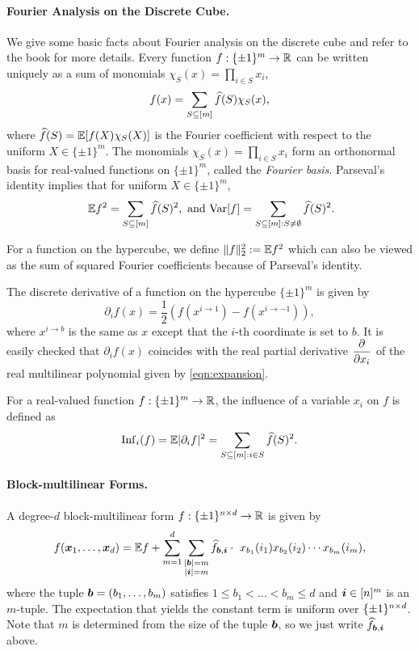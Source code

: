 \paragraph{Fourier Analysis on the Discrete Cube.}
\label{sec:fourier}
We give some basic facts about Fourier analysis on the discrete cube and refer to the book \cite{OD14} for more details. Every function $f: \{\pm1\}^m \to {\mathbb R}$ can be written uniquely as a sum of monomials $\chi_S(x) = \prod_{i \in S} x_i$,
\begin{align}\label{eqn:expansion}
    f(x) = \sum_{S \subseteq [m]} \widehat{f}(S) \chi_S(x),
\end{align}
where $\widehat{f}(S) = \mathbb{E}[f(X)\chi_S(X)]$ is the Fourier coefficient with respect to the uniform $X \in \{\pm 1\}^m$. The monomials $\chi_S(x) = \prod_{i \in S} x_i$ form an orthonormal basis for real-valued functions on $\{\pm1\}^m$, called the \emph{Fourier basis}. Parseval's identity implies that for uniform $X \in \{\pm 1\}^m$,
\begin{align*}
    \ \mathbb{E} f^2 = \sum_{S \subseteq [m]} \widehat{f}(S)^2, \text{ and } \mathrm{Var}[f] = \sum_{S \subseteq [m]: S \neq \emptyset} \widehat{f}(S)^2.
\end{align*}

For a function on the hypercube, we define $\|f\|^2_2 := \mathbb{E} f^2$ which can also be viewed as the sum of squared Fourier coefficients because of Parseval's identity.



The discrete derivative of a function on the hypercube $\{\pm 1\}^m$ is given by  
\[ \partial_i f(x) = \frac{1}{2} (f(x^{i\to 1}) - f(x^{i\to -1})),\]
where $x^{i\to b}$ is the same as $x$ except that the $i$-th coordinate is set to $b$. It is easily checked that $\partial_i f(x)$ coincides with the real partial derivative $\dfrac{\partial{}}{\partial x_i}$ of the real multilinear polynomial given by \eqref{eqn:expansion}. 

For a real-valued function $f: \{\pm 1\}^m \to {\mathbb R}$, the influence of a variable $x_i$ on $f$ is defined as 
\[ \mathrm{Inf}_i(f) = \mathbb{E}| \partial_if|^2 = \sum_{S \subseteq [m] : i \in S} \widehat{f}(S)^2. \]




\paragraph{Block-multilinear Forms.} 



A degree-$d$ block-multilinear form $f: \{\pm 1\}^{n \times d} \to {\mathbb R}$ is given by
\begin{equation}\label{eqn:tensor1}
    f(\boldsymbol{x}_1,\ldots, \boldsymbol{x}_d) =  \mathbb{E} f + \sum_{m = 1}^d \sum_{\substack{|\boldsymbol{b}|=m\\|{\boldsymbol{i}}|=m}} \widehat{f}_{\boldsymbol{b}, {\boldsymbol{i}}} \cdot  ~x_{b_1}(i_1)x_{b_2}(i_2)\cdots x_{b_m}({i_m}),
\end{equation}
where the tuple $\boldsymbol{b}  = (b_1, \ldots, b_m)$ satisfies $1 \le b_1 < \ldots < b_m \le d$ and ${\boldsymbol{i}} \in [n]^m$ is an $m$-tuple. The expectation that yields the constant term is uniform over $\{\pm 1\}^{n \times d}$. Note that $m$
 is determined from the size of the tuple $\boldsymbol{b}$, so we just write $\widehat{f}_{\boldsymbol{b}, {\boldsymbol{i}}}$ above. 

